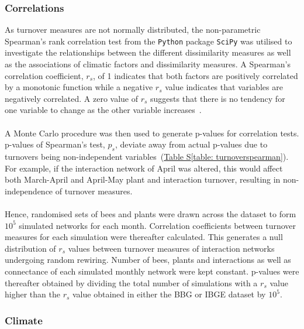 \documentclass[11pt]{article}
\begin{document}

\subsubsection{Correlations}
As turnover measures are not normally distributed, the non-parametric Spearman's rank correlation test from the \texttt{Python} package \texttt{SciPy} was utilised to investigate the relationships between the different dissimilarity measures as well as the associations of climatic factors and dissimilarity measures. A Spearman's correlation coefficient, $r_{s}$, of 1 indicates that both factors are positively correlated by a monotonic function while a negative $r_{s}$ value indicates that variables are negatively correlated. A zero value of $r_{s}$ suggests that there is no tendency for one variable to change as the other variable increases~\citep{Dehmer2011}. \\
\\
A Monte Carlo procedure was then used to generate p-values for correlation tests. p-values of Spearman's test, $p_{s}$, deviate away from actual p-values due to turnovers being non-independent variables~(\hyperref[table: turnoverspearman]{Table S\ref{table: turnoverspearman}}). For example, if the interaction network of April was altered, this would affect both March-April and April-May plant and interaction turnover, resulting in non-independence of turnover measures.\\
\\
Hence, randomised sets of bees and plants were drawn across the dataset to form $10^{5}$ simulated networks for each month. Correlation coefficients between turnover measures for each simulation were thereafter calculated. This generates a null distribution of $r_{s}$ values between turnover measures of interaction networks undergoing random rewiring. Number of bees, plants and interactions as well as connectance of each simulated monthly network were kept constant. p-values were thereafter obtained by dividing the total number of simulations with a $r_{s}$ value higher than the $r_{s}$ value obtained in either the BBG or IBGE dataset by $10^{5}$.

\subsubsection{Climate}
\end{document}
